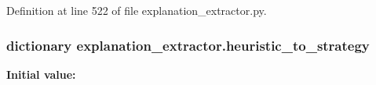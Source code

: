 Definition at line 522 of file explanation\+\_\+extractor.\+py.

\hypertarget{namespaceexplanation__extractor_a4e9dc7c262525efa41529de247ccb96a}{}
\subsubsection[{heuristic\+\_\+to\+\_\+strategy}]{\setlength{\rightskip}{0pt plus 5cm}dictionary explanation\+\_\+extractor.\+heuristic\+\_\+to\+\_\+strategy}\label{namespaceexplanation__extractor_a4e9dc7c262525efa41529de247ccb96a}
{\bfseries Initial value\+:}
